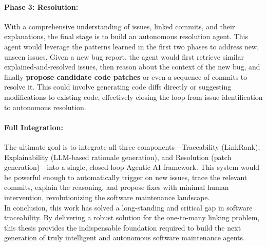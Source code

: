     \paragraph{Phase 3: Resolution:} With a comprehensive understanding of issues, linked commits, and their explanations, the final stage is to build an autonomous resolution agent. This agent would leverage the patterns learned in the first two phases to address new, unseen issues. Given a new bug report, the agent would first retrieve similar explained-and-resolved issues, then reason about the context of the new bug, and finally \textbf{propose candidate code patches} or even a sequence of commits to resolve it. This could involve generating code diffs directly or suggesting modifications to existing code, effectively closing the loop from issue identification to autonomous resolution.

    \paragraph{Full Integration:} The ultimate goal is to integrate all three components---Traceability (LinkRank), Explainability (LLM-based rationale generation), and Resolution (patch generation)---into a single, closed-loop Agentic AI framework. This system would be powerful enough to automatically trigger on new issues, trace the relevant commits, explain the reasoning, and propose fixes with minimal human intervention, revolutionizing the software maintenance landscape.\\


In conclusion, this work has solved a long-standing and critical gap in software traceability. By delivering a robust solution for the one-to-many linking problem, this thesis provides the indispensable foundation required to build the next generation of truly intelligent and autonomous software maintenance agents.
